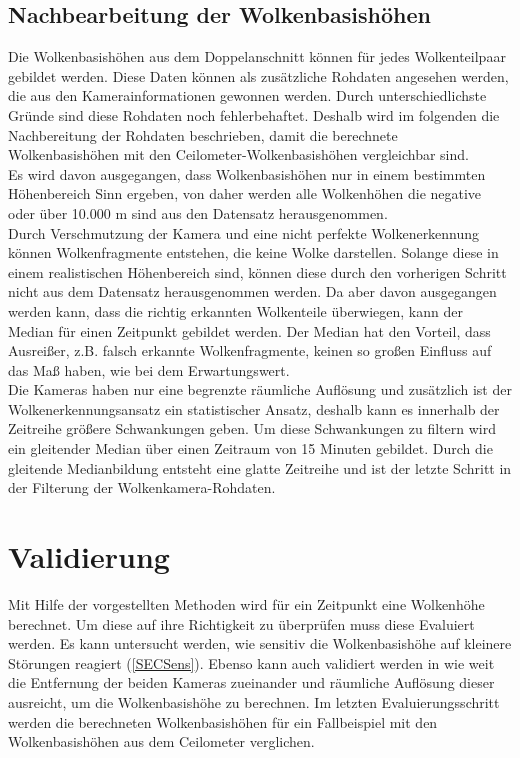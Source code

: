 \documentclass[a4paper,11pt,twoside,german]{article}
\begin{document}
\subsection{Nachbearbeitung der Wolkenbasishöhen}
\label{SECHeightPost}
Die Wolkenbasishöhen aus dem Doppelanschnitt können für jedes Wolkenteilpaar gebildet werden. Diese Daten können als zusätzliche Rohdaten angesehen werden, die aus den Kamerainformationen gewonnen werden. Durch unterschiedlichste Gründe sind diese Rohdaten noch fehlerbehaftet. Deshalb wird im folgenden die Nachbereitung der Rohdaten beschrieben, damit die berechnete Wolkenbasishöhen mit den Ceilometer-Wolkenbasishöhen vergleichbar sind.\\
Es wird davon ausgegangen, dass Wolkenbasishöhen nur in einem bestimmten Höhenbereich Sinn ergeben, von daher werden alle Wolkenhöhen die negative oder über 10.000 m sind aus den Datensatz herausgenommen.\\
Durch Verschmutzung der Kamera und eine nicht perfekte Wolkenerkennung können Wolkenfragmente entstehen, die keine Wolke darstellen. Solange diese in einem realistischen Höhenbereich sind, können diese durch den vorherigen Schritt nicht aus dem Datensatz herausgenommen werden. Da aber davon ausgegangen werden kann, dass die richtig erkannten Wolkenteile überwiegen, kann der Median für einen Zeitpunkt gebildet werden. Der Median hat den Vorteil, dass Ausreißer, z.B. falsch erkannte Wolkenfragmente, keinen so großen Einfluss auf das Maß haben, wie bei dem Erwartungswert.\\
Die Kameras haben nur eine begrenzte räumliche Auflösung und zusätzlich ist der Wolkenerkennungsansatz ein statistischer Ansatz, deshalb kann es innerhalb der Zeitreihe größere Schwankungen geben. Um diese Schwankungen zu filtern wird ein gleitender Median über einen Zeitraum von 15 Minuten gebildet. Durch die gleitende Medianbildung entsteht eine glatte Zeitreihe und ist der letzte Schritt in der Filterung der Wolkenkamera-Rohdaten.\\


\section{Validierung}
\label{SECValidation}
Mit Hilfe der vorgestellten Methoden wird für ein Zeitpunkt eine Wolkenhöhe berechnet. Um diese auf ihre Richtigkeit zu überprüfen muss diese Evaluiert werden. Es kann untersucht werden, wie sensitiv die Wolkenbasishöhe auf kleinere Störungen reagiert (\ref{SECSens}). Ebenso kann auch validiert werden in wie weit die Entfernung der beiden Kameras zueinander und räumliche Auflösung dieser ausreicht, um die Wolkenbasishöhe zu berechnen. Im letzten Evaluierungsschritt werden die berechneten Wolkenbasishöhen für ein Fallbeispiel mit den Wolkenbasishöhen aus dem Ceilometer verglichen.
\end{document}
